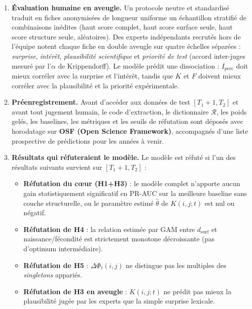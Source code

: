 \documentclass[a4paper,11pt]{article}
\providecommand{\tightlist}{\setlength{\itemsep}{0pt}\setlength{\parskip}{0pt}}
\begin{document}
\begin{enumerate}
  \(N_{ij}\) à la loi de Poisson prédite par
  \(\lambda_{ij}(t)\Delta t\).
\item
  \textbf{Évaluation humaine en aveugle.} Un protocole neutre et
  standardisé traduit en fiches anonymisées de longueur uniforme un
  échantillon stratifié de combinaisons inédites (haut score complet,
  haut score surface seule, haut score structure seule, aléatoires). Des
  experts indépendants recrutés hors de l'équipe notent chaque fiche en
  double aveugle sur quatre échelles séparées : \emph{surprise},
  \emph{intérêt}, \emph{plausibilité scientifique} et \emph{priorité de
  test} (accord inter-juges mesuré par l'\(\alpha\) de Krippendorff). Le
  modèle prédit une dissociation : \(I_{\mathrm{perc}}\) doit mieux
  corréler avec la surprise et l'intérêt, tandis que \(K\) et \(F\)
  doivent mieux corréler avec la plausibilité et la priorité
  expérimentale.
\item
  \textbf{Préenregistrement.} Avant d'accéder aux données de test
  \([T_1+1, T_2]\) et avant tout jugement humain, le code d'extraction,
  le dictionnaire \(\mathcal{R}\), les poids gelés, les baselines, les
  métriques et les seuils de réfutation sont déposés avec horodatage sur
  \textbf{OSF (Open Science Framework)}, accompagnés d'une liste
  prospective de prédictions pour les années à venir.
\item
  \textbf{Résultats qui réfuteraient le modèle.} Le modèle est réfuté si
  l'un des résultats suivants survient sur \([T_1+1, T_2]\) :

  \begin{itemize}
  \tightlist
  \item
    \textbf{Réfutation du cœur (H1+H3)} : le modèle complet n'apporte
    aucun gain statistiquement significatif en PR-AUC sur la meilleure
    baseline sans couche structurelle, ou le paramètre estimé
    \(\hat{\theta}\) de \(K(i,j;t)\) est nul ou négatif.
  \item
    \textbf{Réfutation de H4} : la relation estimée par GAM entre
    \(d_{\mathrm{surf}}\) et naissance/fécondité est strictement
    monotone décroissante (pas d'optimum intermédiaire).
  \item
    \textbf{Réfutation de H5} : \(\Delta \Phi_t(i,j)\) ne distingue pas
    les multiples des \emph{singletons} appariés.
  \item
    \textbf{Réfutation de H3 en aveugle} : \(K(i,j;t)\) ne prédit pas
    mieux la plausibilité jugée par les experts que la simple surprise
    lexicale.
  \end{itemize}
\end{enumerate}
\end{document}
